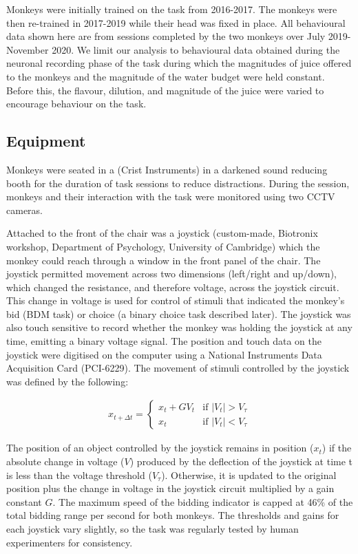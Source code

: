 Monkeys were initially trained on the task from 2016-2017. The monkeys were then re-trained in 2017-2019 while their head was fixed in place. All behavioural data shown here are from sessions completed by the two monkeys over July 2019-November 2020. We limit our analysis to behavioural data obtained during the neuronal recording phase of the task during which the magnitudes of juice offered to the monkeys and the magnitude of the water budget were held constant. Before this, the flavour, dilution, and magnitude of the juice were varied to encourage behaviour on the task.

\subsection{Equipment}

Monkeys were seated in a (Crist Instruments) in a darkened sound reducing booth for the duration of task sessions to reduce distractions. During the session, monkeys and their interaction with the task were monitored using two CCTV cameras.

Attached to the front of the chair was a joystick (custom-made, Biotronix workshop, Department of Psychology, University of Cambridge) which the monkey could reach through a window in the front panel of the chair. The joystick permitted movement across two dimensions (left/right and up/down), which changed the resistance, and therefore voltage, across the joystick circuit. This change in voltage is used for control of stimuli that indicated the monkey’s bid (BDM task) or choice (a binary choice task described later). The joystick was also touch sensitive to record whether the monkey was holding the joystick at any time, emitting a binary voltage signal. The position and touch data on the joystick were digitised on the computer using a National Instruments Data Acquisition Card (PCI-6229). The movement of stimuli controlled by the joystick was defined by the following:

\begin{equation}
\begin{aligned}
x_{t+\Delta t} = 
\begin{cases}
x_t + GV_t & \text{if } |V_t| > V_{\tau} \\
x_t & \text{if } |V_t| < V_{\tau}
\end{cases}
\end{aligned}
\label{eq:joystick}
\end{equation}

The position of an object controlled by the joystick remains in position ($x_t$) if the absolute change in voltage ($V$) produced by the deflection of the joystick at time t is less than the voltage threshold ($V_\tau$). Otherwise, it is updated to the original position plus the change in voltage in the joystick circuit multiplied by a gain constant $G$. The maximum speed of the bidding indicator is capped at 46\% of the total bidding range per second for both monkeys. The thresholds and gains for each joystick vary slightly, so the task was regularly tested by human experimenters for consistency.

